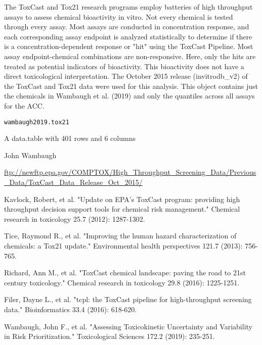 \documentclass[a4paper]{book}
\begin{document}
\begin{Description}\relax
The ToxCast and Tox21 research programs employ batteries of high throughput
assays to assess chemical bioactivity in vitro. Not every chemical is tested
through every assay. Most assays are conducted in concentration response,
and each corresponding assay endpoint is analyzed statistically to determine
if there is a concentration-dependent response or "hit" using the ToxCast
Pipeline.  Most assay endpoint-chemical combinations are non-responsive.
Here, only the hits are treated as potential indicators of bioactivity. This
bioactivity does not have a direct toxicological interpretation. The October
2015 release (invitrodb\_v2) of the ToxCast and Tox21 data were used for this
analysis. This object contains just the chemicals in Wambaugh et al. (2019)
and only the quantiles across all assays for the ACC.
\end{Description}
%
\begin{Usage}
\begin{verbatim}
wambaugh2019.tox21
\end{verbatim}
\end{Usage}
%
\begin{Format}
A data.table with 401 rows and 6 columns
\end{Format}
%
\begin{Author}\relax
John Wambaugh
\end{Author}
%
\begin{Source}\relax
\url{ftp://newftp.epa.gov/COMPTOX/High_Throughput_Screening_Data/Previous_Data/ToxCast_Data_Release_Oct_2015/}
\end{Source}
%
\begin{References}\relax
Kavlock, Robert, et al. "Update on EPA's ToxCast program:
providing high throughput decision support tools for chemical risk
management." Chemical research in toxicology 25.7 (2012): 1287-1302.

Tice, Raymond R., et al. "Improving the human hazard characterization of
chemicals: a Tox21 update." Environmental health perspectives 121.7 (2013):
756-765.

Richard, Ann M., et al. "ToxCast chemical landscape: paving the road to 21st
century toxicology." Chemical research in toxicology 29.8 (2016): 1225-1251.

Filer, Dayne L., et al. "tcpl: the ToxCast pipeline for high-throughput
screening data." Bioinformatics 33.4 (2016): 618-620.

Wambaugh, John F., et al. "Assessing Toxicokinetic Uncertainty and 
Variability in Risk Prioritization." Toxicological Sciences 172.2 (2019): 
235-251.
\end{References}
\end{document}
